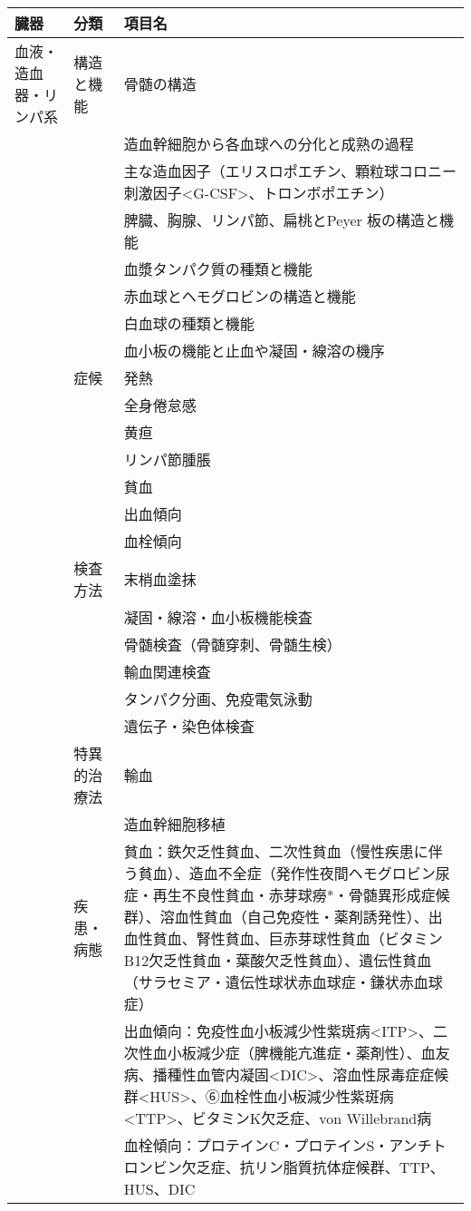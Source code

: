 \begin{xltabular}{\linewidth}{XXX}
\caption{\label{tbl:知識}} \\
\toprule
臓器 & 分類 & 項目名 \\
\midrule
\endhead
血液・造血器・リンパ系 & 構造と機能 & 骨髄の構造 \\
 &  & 造血幹細胞から各血球への分化と成熟の過程 \\
 &  & 主な造血因子（エリスロポエチン、顆粒球コロニー刺激因子<G-CSF>、トロンボポエチン） \\
 &  & 脾臓、胸腺、リンパ節、扁桃とPeyer 板の構造と機能 \\
 &  & 血漿タンパク質の種類と機能 \\
 &  & 赤血球とヘモグロビンの構造と機能 \\
 &  & 白血球の種類と機能 \\
 &  & 血小板の機能と止血や凝固・線溶の機序 \\
 & 症候 & 発熱 \\
 &  & 全身倦怠感 \\
 &  & 黄疸 \\
 &  & リンパ節腫脹 \\
 &  & 貧血 \\
 &  & 出血傾向 \\
 &  & 血栓傾向 \\
 & 検査方法 & 末梢血塗抹 \\
 &  & 凝固・線溶・血小板機能検査 \\
 &  & 骨髄検査（骨髄穿刺、骨髄生検） \\
 &  & 輸血関連検査 \\
 &  & タンパク分画、免疫電気泳動 \\
 &  & 遺伝子・染色体検査 \\
 & 特異的治療法 & 輸血 \\
 &  & 造血幹細胞移植 \\
 & 疾患・病態 & 貧血：鉄欠乏性貧血、二次性貧血（慢性疾患に伴う貧血）、造血不全症（発作性夜間ヘモグロビン尿症・再生不良性貧血・赤芽球癆*・骨髄異形成症候群）、溶血性貧血（自己免疫性・薬剤誘発性）、出血性貧血、腎性貧血、巨赤芽球性貧血（ビタミンB12欠乏性貧血・葉酸欠乏性貧血）、遺伝性貧血（サラセミア・遺伝性球状赤血球症・鎌状赤血球症） \\
 &  & 出血傾向：免疫性血小板減少性紫斑病<ITP>、二次性血小板減少症（脾機能亢進症・薬剤性）、血友病、播種性血管内凝固<DIC>、溶血性尿毒症症候群<HUS>、➅血栓性血小板減少性紫斑病<TTP>、ビタミンK欠乏症、von Willebrand病 \\
 &  & 血栓傾向：プロテインC・プロテインS・アンチトロンビン欠乏症、抗リン脂質抗体症候群、TTP、HUS、DIC \\

\end{xltabular}
